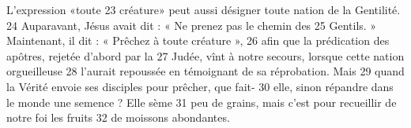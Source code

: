 L'expression «toute	 
23	 	créature» peut aussi désigner toute nation de la Gentilité.	 
24	 	Auparavant, Jésus avait dit : « Ne prenez pas le chemin des	 
25	 	Gentils. » Maintenant, il dit : « Prêchez à toute créature »,	 
26	 	afin que la prédication des apôtres, rejetée d'abord par la	 
27	 	Judée, vînt à notre secours, lorsque cette nation orgueilleuse	 
28	 	l'aurait repoussée en témoignant de sa réprobation. Mais	 
29	 	quand la Vérité envoie ses disciples pour prêcher, que fait-	 
30	 	elle, sinon répandre dans le monde une semence ? Elle sème	 
31	 	peu de grains, mais c'est pour recueillir de notre foi les fruits	 
32	 	de moissons abondantes.